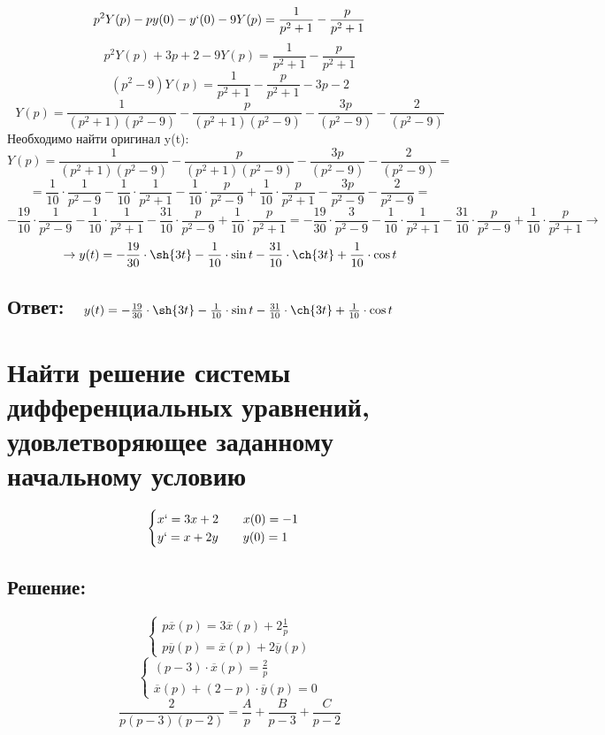 \documentclass{article}
\begin{document}
        $$p^2Y(p) - py(0) - y`(0) - 9Y(p) = \frac{1}{p^2 + 1} - \frac{p}{p^2 + 1}$$
        $$ p^2Y(p) + 3p + 2 - 9Y(p) = \frac{1}{p^2 + 1} - \frac{p}{p^2 + 1}$$
        $$(p^2 - 9)Y(p) = \frac{1}{p^2 + 1} - \frac{p}{p^2 + 1} - 3p - 2 $$
        $$Y(p) = \frac{1}{(p^2 + 1)(p^2 - 9)} - \frac{p}{(p^2 + 1)(p^2 - 9)} - \frac{3p}{(p^2 - 9)} - \frac{2}{(p^2 - 9)}$$
        Необходимо найти оригинал y(t):
        $$Y(p) = \frac{1}{(p^2 + 1)(p^2 - 9)} - \frac{p}{(p^2 + 1)(p^2 - 9)} - \frac{3p}{(p^2 - 9)} - \frac{2}{(p^2 - 9)} = $$
        $$ = \frac{1}{10} \cdot \frac{1}{p^2 - 9} - \frac{1}{10} \cdot \frac{1}{p^2 + 1} - \frac{1}{10} \cdot \frac{p}{p^2 - 9} + \frac{1}{10} \cdot \frac{p}{p^2 + 1} - \frac{3p}{p^2 - 9} - \frac{2}{p^2 - 9} = $$
        $$-\frac{19}{10} \cdot \frac{1}{p^2 - 9} - \frac{1}{10} \cdot \frac{1}{p^2 + 1} - \frac{31}{10} \cdot \frac{p}{p^2 - 9} + \frac{1}{10} \cdot \frac{p}{p^2 + 1} = -\frac{19}{30}\cdot \frac{3}{p^2 - 9} - \frac{1}{10} \cdot \frac{1}{p^2 + 1} - \frac{31}{10} \cdot \frac{p}{p^2 - 9} + \frac{1}{10} \cdot \frac{p}{p^2 + 1} \rightarrow$$
        $$\rightarrow y(t) = -\frac{19}{30} \cdot \sh{3t} - \frac{1}{10} \cdot \sin{t} - \frac{31}{10} \cdot \ch{3t} + \frac{1}{10} \cdot \cos{t}$$
        \subsection{Ответ: $ \quad y(t) = -\frac{19}{30} \cdot \sh{3t} - \frac{1}{10} \cdot \sin{t} - \frac{31}{10} \cdot \ch{3t} + \frac{1}{10} \cdot \cos{t}$}

        \section{Найти решение системы дифференциальных уравнений, удовлетворяющее заданному начальному условию }
        \[
            \begin{cases} x` = 3x + 2 \quad\quad x(0) = -1\\ y` = x + 2y \quad\quad y(0) = 1   \end {cases} 
        \]
         \subsection{Решение:}
        \[
            \begin{cases} p\overline{x}(p) = 3 \overline{x}(p) + 2 \frac{1}{p} \\ p\overline{y}(p) = \overline{x}(p) + 2\overline{y}(p)\end {cases} 
        \]
        \[
            \begin{cases} (p - 3)\cdot \overline{x}(p) = \frac{2}{p} \\ \overline{x}(p) + (2 - p)\cdot \overline{y}(p) = 0\end {cases} 
        \]
        \[
        \frac{2}{p(p - 3)(p - 2)} = \frac{A}{p} + \frac{B}{p - 3} + \frac{C}{p - 2}
        \]
\end{document}

